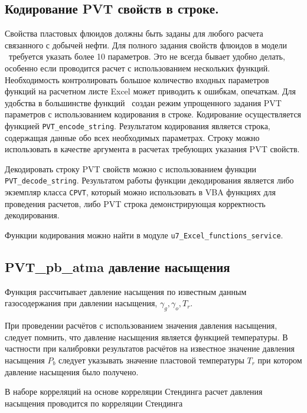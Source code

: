 \subsection{Кодирование PVT свойств в строке.}
Свойства пластовых флюидов должны быть заданы для любого расчета связанного с добычей нефти. Для полного задания свойств флюидов в модели \unf\ требуется указать более 10 параметров. Это не всегда бывает удобно делать, особенно если проводится расчет с использованием нескольких функций. Необходимость контролировать большое количество входных параметров функций на расчетном листе Excel может приводить к ошибкам, опечаткам.
Для удобства в большинстве функций \unf \ создан режим упрощенного задания PVT параметров с использованием кодирования в строке. Кодирование осуществляется функцией \texttt{PVT_encode_string}. Результатом кодирования является строка, содержащая данные обо всех необходимых параметрах. Строку можно использовать в качестве аргумента в расчетах требующих указания PVT свойств.   


Декодировать строку PVT свойств можно с использованием функции  \texttt{PVT_decode_string}. Результатом работы функции декодирования является либо экземпляр класса \texttt{CPVT}, который можно использовать в VBA функциях для проведения расчетов, либо PVT строка демонстрирующая корректность декодирования. 


Функции кодирования можно найти в модуле \texttt{u7_Excel_functions_service}. 

\subsection{PVT\_pb\_atma давление насыщения}
Функция рассчитывает давление насыщения по известным данным газосодержания при давлении насыщения, $\gamma_g, \gamma_o, T_r$.

При проведении расчётов с использованием значения давления насыщения, следует помнить, что давление насыщения является функцией температуры. В частности при калибровки результатов расчётов на известное значение давления насыщения $P_b$ следует указывать значение пластовой температуры $T_r$ при котором давление насыщения было получено. 

В наборе корреляций на основе корреляции Стендинга расчет давления насыщения проводится по корреляции Стендинга \cite{Yukos_PVT_2002}

